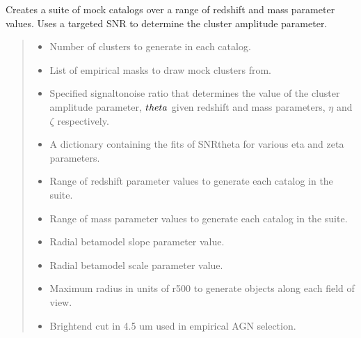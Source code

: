 \documentclass[letterpaper,12pt,english]{sphinxmanual}
\begin{document}
\begin{fulllineitems}
\begin{fulllineitems}
\pysigstopsignatures
\sphinxAtStartPar
Creates a suite of mock catalogs over a range of redshift and mass parameter values. Uses a targeted SNR to
determine the cluster amplitude parameter.
\begin{quote}\begin{description}
\begin{itemize}
\item {} 
\sphinxAtStartPar
{} \textendash{} Number of clusters to generate in each catalog.

\item {} 
\sphinxAtStartPar
{} \textendash{} List of empirical masks to draw mock clusters from.

\item {} 
\sphinxAtStartPar
{} \textendash{} Specified signal\sphinxhyphen{}to\sphinxhyphen{}noise ratio that determines the value of the cluster amplitude parameter,
\(\\theta\) given redshift and mass parameters, \(\eta\) and \(\zeta\) respectively.

\item {} 
\sphinxAtStartPar
{} \textendash{} A dictionary containing the fits of SNR\textendash{}theta for various eta and zeta parameters.

\item {} 
\sphinxAtStartPar
{} \textendash{} Range of redshift parameter values to generate each catalog in the suite.

\item {} 
\sphinxAtStartPar
{} \textendash{} Range of mass parameter values to generate each catalog in the suite.

\item {} 
\sphinxAtStartPar
{} \textendash{} Radial beta\sphinxhyphen{}model slope parameter value.

\item {} 
\sphinxAtStartPar
{} \textendash{} Radial beta\sphinxhyphen{}model scale parameter value.

\item {} 
\sphinxAtStartPar
{} \textendash{} Maximum radius in units of r500 to generate objects along each field of view.

\item {} 
\sphinxAtStartPar
{} \textendash{} Bright\sphinxhyphen{}end cut in 4.5 um used in empirical AGN selection.


\end{itemize}
\end{description}
\end{quote}
\end{fulllineitems}
\end{fulllineitems}
\end{document}
